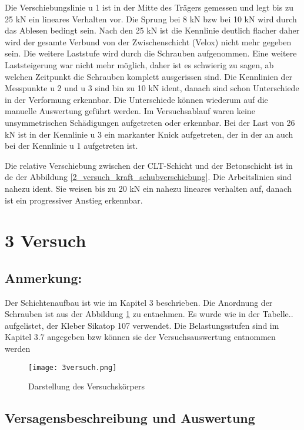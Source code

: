 \documentclass[12 pt,a4 paper ]{scrreprt}
\begin{document}
Die Verschiebungslinie u 1 ist in der Mitte des Trägers gemessen und legt bis zu 25 kN ein lineares Verhalten vor. Die Sprung bei 8 kN bzw bei 10 kN wird durch das Ablesen bedingt sein. Nach den 25 kN ist die Kennlinie deutlich flacher daher wird der gesamte Verbund von der Zwischenschicht (Velox) nicht mehr gegeben sein. Die weitere Laststufe wird durch die Schrauben aufgenommen. Eine weitere Laststeigerung war nicht mehr möglich, daher ist es schwierig zu sagen, ab welchen Zeitpunkt die Schrauben komplett ausgerissen sind.
Die Kennlinien der Messpunkte u 2 und u 3 sind bin zu 10 kN ident, danach sind schon Unterschiede in der Verformung erkennbar. Die Unterschiede können wiederum auf die manuelle Auswertung geführt werden. Im Versuchsablauf waren  keine unsymmetrischen Schädigungen aufgetreten oder erkennbar. Bei der Last von 26 kN ist in der Kennlinie u 3 ein markanter Knick aufgetreten, der in der an auch bei der Kennlinie u 1 aufgetreten ist. 

Die relative Verschiebung zwischen der CLT-Schicht und der Betonschicht ist in de der Abbildung \ref{2_versuch_kraft_schubverschiebung}. Die Arbeitslinien sind nahezu ident. Sie weisen bis zu 20 kN ein nahezu lineares verhalten auf, danach ist ein progressiver Anstieg erkennbar.

\section{3 Versuch}

\subsection{Anmerkung:}
Der Schichtenaufbau ist wie im Kapitel 3 beschrieben. Die Anordnung der Schrauben ist aus der Abbildung \ref{3versuch} zu entnehmen. Es wurde wie in der Tabelle..  aufgelistet, der Kleber Sikatop 107 verwendet. Die Belastungsstufen sind im Kapitel 3.7 angegeben bzw können sie der Versuchsauswertung entnommen werden

\begin{figure}
\begin{center}
\texttt{[image: 3versuch.png]}
\caption{Darstellung des Versuchskörpers}
\label{3versuch}
\end{center}
\end{figure}

\subsection{Versagensbeschreibung und Auswertung}
\end{document}
